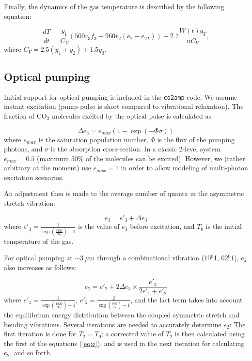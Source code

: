 \documentclass{report}
\begin{document}
Finally, the dynamics of the gas temperature is described by the following equation:

\begin{equation}\label{eq:dTdt}
\frac{dT}{dt} = \frac{y_1}{C_V}(500r_3f_3 + 960r_2(e_2-e_{2T})) + 2.7\frac{W(t)q_T}{nC_V},
\end{equation}
where $C_V = 2.5(y_1+y_2) + 1.5y_3$.


\subsection{Optical pumping}
Initial support for optical pumping is included in the \texttt{co2amp} code. We assume instant excitation (pump pulse is short compared to vibrational relaxation).  The fraction of {CO$_2$} molecules excited by the optical pulse is calculated as

\begin{equation}\label{eq:OpticalPumping_N}
\Delta e_3 = e_{max} \left(1-\exp(-\Phi \sigma)\right)
\end{equation}
where $e_{max}$ is the saturation population number, $\Phi$ is the flux of the pumping photons, and $\sigma$ is the absorption cross-section. In a classic 2-level system $e_{max} = 0.5$ (maximum 50\% of the molecules can be excited). However, we (rather arbitrary at the moment) use  $e_{max} = 1$ in order to allow modeling of multi-photon excitation scenarios.

An adjustment then is made to the average number of quanta in the asymmetric stretch vibration:

\begin{equation}\label{eq:OpticalPumping_e3}
e_3 = e'_3 + \Delta e_3
\end{equation}
where $e'_3 = \frac{1}{\exp\left(\frac{3350}{T_0}\right)-1}$ is the value of $e_3$ before excitation, and $T_0$ is the initial temperature of the gas.

For optical pumping at {$\sim 3~\mu$m} through a combinational vibration {(10$^0$1, 02$^0$1)}, $e_2$ also increases as follows:

\begin{equation}\label{eq:OpticalPumping_e2}
e_2 = e'_2 + 2 \Delta e_3 \times \frac{e'_2}{2e'_1+e'_2}
\end{equation}
where $e'_1 = \frac{1}{\exp\left(\frac{1920}{T_2}\right)-1}$, $e'_2 = \frac{2}{\exp\left(\frac{960}{T_2}\right)-1}$, and the last term takes into account the equilibrium energy distribution between the coupled symmetric stretch and bending vibrations. Several iterations are needed to accurately determine $e_2$: The first iteration is done for $T_2=T_0$; a corrected value of $T_2$ is then calculated using the first of the equations (\ref{eq:e}), and is used in the next iteration for calculating $e_2$, and so forth.
\end{document}
